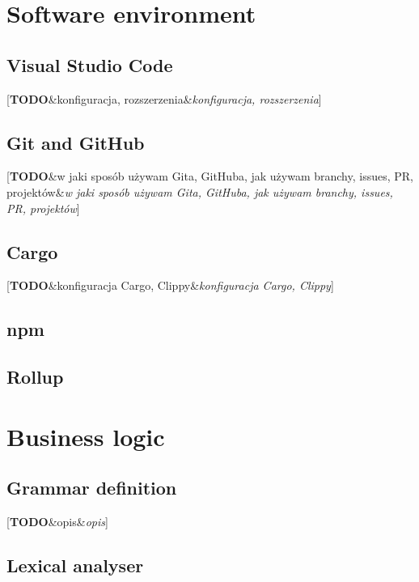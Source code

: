 \documentclass[english,engineering]{wizthesis}
\newcommand{\todo}[1]{%
  {\color{red}[\textbf{TODO}\ifx&#1&{}\else{ }\fi\textit{#1}]}%
}
\begin{document}
\section{Software environment}

\subsection*{Visual Studio Code}

\todo{konfiguracja, rozszerzenia}

\subsection*{Git and GitHub}

\todo{w jaki sposób używam Gita, GitHuba, jak używam branchy, issues, PR,
projektów}

\subsection*{Cargo}

\todo{konfiguracja Cargo, Clippy}

\subsection*{npm}

\subsection*{Rollup}

\section{Business logic}

\subsection{Grammar definition}


\todo{opis}

\subsection{Lexical analyser}
\end{document}
